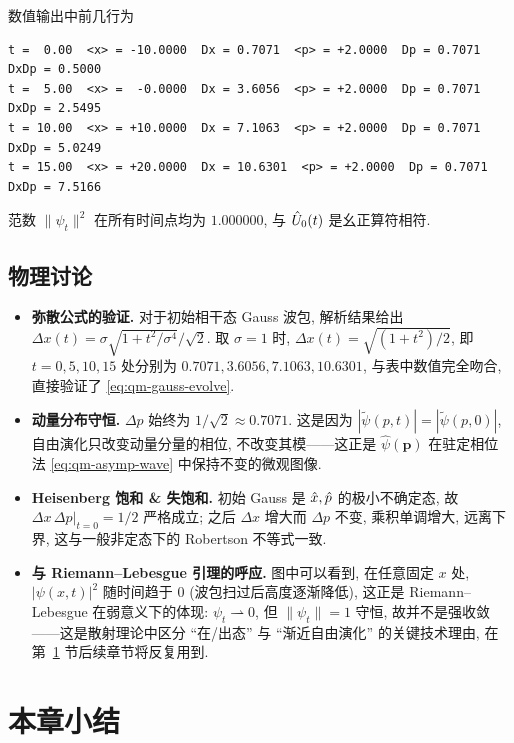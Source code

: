 数值输出中前几行为
\begin{verbatim}
t =  0.00  <x> = -10.0000  Dx = 0.7071  <p> = +2.0000  Dp = 0.7071  DxDp = 0.5000
t =  5.00  <x> =  -0.0000  Dx = 3.6056  <p> = +2.0000  Dp = 0.7071  DxDp = 2.5495
t = 10.00  <x> = +10.0000  Dx = 7.1063  <p> = +2.0000  Dp = 0.7071  DxDp = 5.0249
t = 15.00  <x> = +20.0000  Dx = 10.6301  <p> = +2.0000  Dp = 0.7071  DxDp = 7.5166
\end{verbatim}
范数 $\|\psi_{t}\|^{2}$ 在所有时间点均为 $1.000000$, 与 $\hat{U}_{0}(t)$ 是幺正算符相符.

\subsection*{物理讨论}
\begin{itemize}
    \item \textbf{弥散公式的验证.} 对于初始相干态 Gauss 波包, 解析结果给出 $\Delta x(t)=\sigma\sqrt{1+t^{2}/\sigma^{4}}/\sqrt{2}$. 取 $\sigma=1$ 时, $\Delta x(t)=\sqrt{(1+t^{2})/2}$, 即 $t=0,5,10,15$ 处分别为 $0.7071,3.6056,7.1063,10.6301$, 与表中数值完全吻合, 直接验证了 \eqref{eq:qm-gauss-evolve}.
    \item \textbf{动量分布守恒.} $\Delta p$ 始终为 $1/\sqrt{2}\approx0.7071$. 这是因为 $|\widetilde\psi(p,t)|=|\widetilde\psi(p,0)|$, 自由演化只改变动量分量的相位, 不改变其模——这正是 $\hat\psi(\mathbf p)$ 在驻定相位法 \eqref{eq:qm-asymp-wave} 中保持不变的微观图像.
    \item \textbf{Heisenberg 饱和 \& 失饱和.} 初始 Gauss 是 $\hat{x},\hat{p}$ 的极小不确定态, 故 $\Delta x\,\Delta p|_{t=0}=1/2$ 严格成立; 之后 $\Delta x$ 增大而 $\Delta p$ 不变, 乘积单调增大, 远离下界, 这与一般非定态下的 Robertson 不等式一致.
    \item \textbf{与 Riemann--Lebesgue 引理的呼应.} 图中可以看到, 在任意固定 $x$ 处, $|\psi(x,t)|^{2}$ 随时间趋于 $0$ (波包扫过后高度逐渐降低), 这正是 Riemann--Lebesgue 在弱意义下的体现: $\psi_{t}\rightharpoonup 0$, 但 $\|\psi_{t}\|=1$ 守恒, 故并不是强收敛——这是散射理论中区分 ``在/出态'' 与 ``渐近自由演化'' 的关键技术理由, 在第~\ref{sec:qm-review-summary} 节后续章节将反复用到.
\end{itemize}

\section{本章小结}\label{sec:qm-review-summary}

